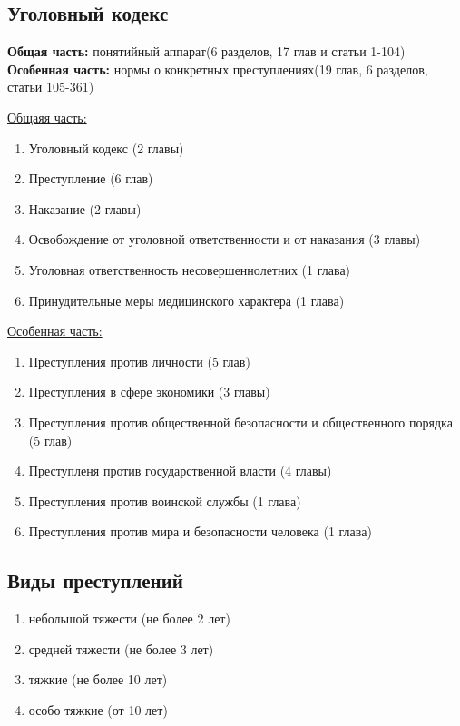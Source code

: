 \documentclass[a5paper,10pt]{article}
\begin{document}
		\subsection{Уголовный кодекс}
			\textbf{Общая часть:} понятийный аппарат(6 разделов, 17 глав и статьи 1-104)
			\textbf{Особенная часть:} нормы о конкретных преступлениях(19 глав, 6 разделов, статьи 105-361)

			\underline{Общаяя часть:}
			\begin{enumerate}[itemsep=0pt]
				\item Уголовный кодекс (2 главы)
				\item Преступление (6 глав)
				\item Наказание (2 главы)
				\item Освобождение от уголовной ответственности и от наказания (3 главы)
				\item Уголовная ответственность несовершеннолетних (1 глава)
				\item Принудительные меры медицинского характера (1 глава)
			\end{enumerate}

			\underline{Особенная часть:}
			\begin{enumerate}[itemsep=0pt]
				\item Преступления против личности (5 глав)
				\item Преступления в сфере экономики (3 главы)
				\item Преступления против общественной безопасности и общественного порядка (5 глав)
				\item Преступленя против государственной власти (4 главы)
				\item Преступления против воинской службы (1 глава)
				\item Преступления против мира и безопасности человека (1 глава)
			\end{enumerate}

		\subsection{Виды преступлений}
			\begin{enumerate}[itemsep=0pt]
				\item небольшой тяжести (не более 2 лет)
				\item средней тяжести (не более 3 лет)
				\item тяжкие (не более 10 лет)
				\item особо тяжкие (от 10 лет)
			\end{enumerate}
\end{document}
